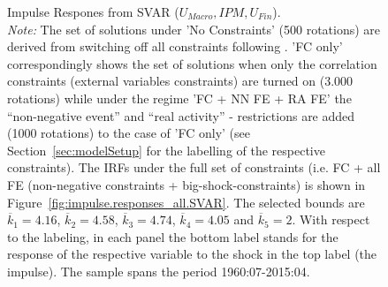 \documentclass[a4paper,11pt,listof=nochaptergap,oneside,pointednumbers,bibtotoc,bigheadings,liststotoc,hidelinks]{scrbook}
\theoremstyle{mysatz}
\theoremstyle{mydefinition}
\theoremstyle{mytheorem}
\theoremstyle{mybemerkung}
\begin{document}
\begin{figure}[!h]
   \centering
   \setlength\fboxsep{0pt}
   \setlength\fboxrule{0pt}
      \caption[Impulse Respones from SVAR ($U_{Macro}, IPM, U_{Fin}$).]{Impulse Respones from SVAR ($U_{Macro}, IPM, U_{Fin}$).\\
      \textit{Note:} The set of solutions under 'No Constraints' (500 rotations) are derived from switching off all constraints following  \citet{ludvigsonetal:19}. 'FC only' correspondingly shows the set of solutions when only the correlation constraints (external variables constraints) are turned on (3.000 rotations) while under the regime 'FC + NN FE + RA FE' the ``non-negative event'' and ``real activity'' - restrictions are added (1000 rotations) to the case of 'FC only' (see Section~\ref{sec:modelSetup} for the labelling of the respective constraints). The IRFs under the full set of constraints (i.e. FC + all FE (non-negative constraints + big-shock-constraints) is shown in Figure~\ref{fig:impulse.responses_all.SVAR}. The selected bounds are $\overline{k}_1 = 4.16$, $\overline{k}_2 = 4.58$, $\overline{k}_3 = 4.74$, $\overline{k}_4 = 4.05$ and $\overline{k}_5 = 2$. With respect to the labeling, in each panel the bottom label stands for the response of the respective variable to the shock in the top label (the impulse). The sample spans the period 1960:07-2015:04.}   \label{fig:impulse.responses_all.SVAR_UNCONSTR}
\end{figure}
\end{document}
